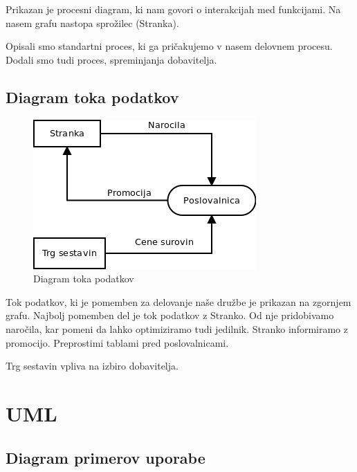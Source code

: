 \documentclass[12pt]{article}
\let\stdsection\section
\renewcommand\section{\newpage\stdsection}
\begin{document}
Prikazan je procesni diagram, ki nam govori o interakcijah med funkcijami. Na nasem grafu nastopa sprožilec (Stranka). 

Opisali smo standartni proces, ki ga pričakujemo v nasem delovnem procesu.
Dodali smo tudi proces, spreminjanja dobavitelja.

\newpage

\subsection{Diagram toka podatkov}

\begin{figure}[htb]
\begin{center}
\includegraphics[scale=0.5]{toka_podatkov.png}
\end{center}
\caption{Diagram toka podatkov}
\label{toka_podatkov}
\end{figure}

Tok podatkov, ki je pomemben za delovanje naše družbe je prikazan na zgornjem grafu. Najbolj pomemben del je tok podatkov z Stranko. Od nje pridobivamo naročila, kar pomeni da lahko optimiziramo tudi jedilnik. Stranko informiramo z promocijo.
Preprostimi tablami pred poslovalnicami.

Trg sestavin vpliva na izbiro dobavitelja.

\newpage

\section{UML}

\subsection{Diagram primerov uporabe}
\end{document}
